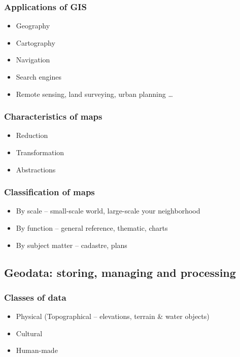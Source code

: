 \documentclass{beamer}
\begin{document}
\begin{frame}
  \frametitle{Applications of GIS}
  \begin{itemize}
  \item Geography
  \item Cartography
  \item Navigation
  \item Search engines
  \item Remote sensing, land surveying, urban planning \ldots{}
  \end{itemize}
\end{frame}

\begin{frame}
  \frametitle{Characteristics of maps}
  \begin{itemize}
  \item<1-> Reduction 
  \item<3-> Transformation 
  \item<5-> Abstractions 
  \end{itemize}
\end{frame}

\begin{frame}
  \frametitle{Classification of maps}
  \begin{itemize}
  \item By scale -- small-scale world, large-scale your neighborhood
  \item By function -- general reference, thematic, charts
  \item By subject matter -- cadastre, plans
  \end{itemize}
\end{frame}


\subsection{Geodata: storing, managing and processing }

\begin{frame}
  \frametitle{Classes of data}
  \begin{itemize}
  \item Physical (Topographical -- elevations, terrain \& water objects)
  \item Cultural
  \item Human-made
  \end{itemize}
\end{frame}
\end{document}
